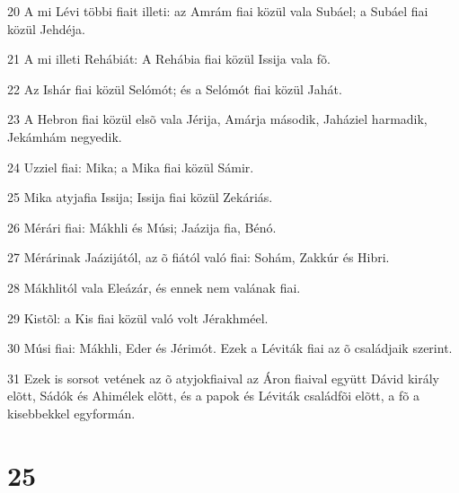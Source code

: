 \par 20 A mi Lévi többi fiait illeti: az Amrám fiai közül vala Subáel; a Subáel fiai közül Jehdéja.
\par 21 A mi illeti Rehábiát: A Rehábia fiai közül Issija vala fõ.
\par 22 Az Ishár fiai közül Selómót; és a Selómót fiai közül Jahát.
\par 23 A Hebron fiai közül elsõ vala Jérija, Amárja második, Jaháziel harmadik, Jekámhám negyedik.
\par 24 Uzziel fiai: Mika; a Mika fiai közül Sámir.
\par 25 Mika atyjafia Issija; Issija fiai közül Zekáriás.
\par 26 Mérári fiai: Mákhli és Músi; Jaázija fia, Bénó.
\par 27 Mérárinak Jaázijától, az õ fiától való fiai: Sohám, Zakkúr és Hibri.
\par 28 Mákhlitól vala Eleázár, és ennek nem valának fiai.
\par 29 Kistõl: a Kis fiai közül való volt Jérakhméel.
\par 30 Músi fiai: Mákhli, Eder és Jérimót. Ezek a Léviták fiai az õ családjaik szerint.
\par 31 Ezek is sorsot vetének az õ atyjokfiaival az Áron fiaival együtt Dávid király elõtt, Sádók és Ahimélek elõtt, és a papok és Léviták családfõi elõtt, a fõ a kisebbekkel egyformán.

\chapter{25}

